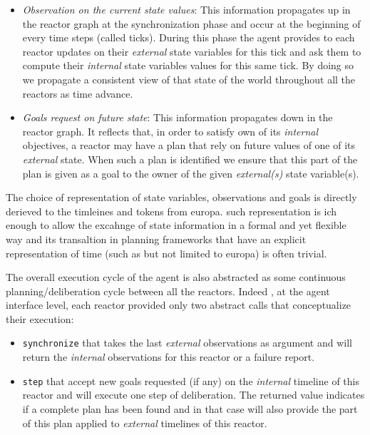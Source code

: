 \begin{itemize}

\item {\em Observation on the current state values}: This information
  propagates up in the reactor graph at the synchronization phase 
  and occur at the beginning of every time steps (called
  ticks). During this phase the agent provides to each reactor 
  updates on their {\em external} state variables for this tick and
  ask them to compute their {\em internal} state variables values for
  this same tick. By doing so we propagate a consistent view of that
  state of the world throughout all the reactors as time advance.

\item {\em Goals request on future state}: This information propagates
  down in the reactor graph. It reflects that, in order to satisfy own
  of its {\em internal} objectives, a reactor may have a plan that
  rely on future values of one of its {\em external} state. When such
  a plan is identified we ensure that this part of the plan is given
  as a goal to the owner of the given {\em external(s)} state variable(s). 

\end{itemize}

The choice of representation of state variables, observations and
goals is directly derieved to the timleines and tokens from europa.
such representation is ich enough to allow the excahnge of state
information in a formal and yet flexible way and its transaltion in
planning frameworks that have an explicit representation of time (such
as but not limited to europa) is often trivial.

The overall execution cycle of the agent is also abstracted as some
continuous planning/deliberation cycle between all the
reactors. Indeed , at the agent interface level, each reactor provided
only two abstract calls that conceptualize their execution:

\begin{itemize}

\item \texttt{synchronize} that takes the last {\em external}
  observations as argument and will return the {\em internal}
  observations for this reactor or a failure report.

\item \texttt{step} that accept new goals requested (if any) on the
  {\em internal} timeline of this reactor and will execute one step of
  deliberation. The returned value indicates if a complete plan has
  been found and in that case will also provide the part of this plan
  applied to {\em external} timelines of this reactor.

\end{itemize}

